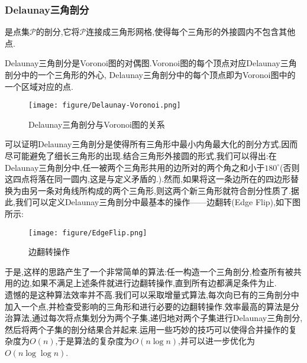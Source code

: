 \documentclass{ctexart}
\begin{document}
\subsubsection{Delaunay三角剖分}
\begin{definition}[Delaunay三角剖分]
    是点集$\mathcal{P}$的剖分,它将$\mathcal{P}$连接成三角形网格,使得每个三角形的外接圆内不包含其他点.
\end{definition}
Delaunay三角剖分是Voronoi图的对偶图.Voronoi图的每个顶点对应Delaunay三角剖分中的一个三角形的外心, Delaunay三角剖分中的每个顶点即为Voronoi图中的一个区域对应的点.
\begin{figure}[H]\centering
    \texttt{[image: figure/Delaunay-Voronoi.png]}
    \caption{Delaunay三角剖分与Voronoi图的关系}
\end{figure}
可以证明Delaunay三角剖分是使得所有三角形中最小内角最大化的剖分方式,因而尽可能避免了细长三角形的出现.结合三角形外接圆的形式,我们可以得出:在Delaunay三角剖分中,任一被两个三角形共用的边所对的两个角之和小于$180^\circ$(否则这四点将落在同一圆内,这是与定义矛盾的.).然而,如果将这一条边所在的四边形替换为由另一条对角线所构成的两个三角形,则这两个新三角形就符合剖分性质了.据此,我们可以定义Delaunay三角剖分中最基本的操作——边翻转(Edge Flip),如下图所示:
\begin{figure}[H]\centering
    \texttt{[image: figure/EdgeFlip.png]}
    \caption{边翻转操作}
\end{figure}
于是,这样的思路产生了一个非常简单的算法:任一构造一个三角剖分,检查所有被共用的边,如果不满足上述条件就进行边翻转操作,直到所有边都满足条件为止.\\
\indent 遗憾的是这种算法效率并不高.我们可以采取增量式算法,每次向已有的三角剖分中加入一个点,并检查受影响的三角形和进行必要的边翻转操作.效率最高的算法是分治算法,通过每次将点集划分为两个子集,递归地对两个子集进行Delaunay三角剖分,然后将两个子集的剖分结果合并起来.运用一些巧妙的技巧可以使得合并操作的复杂度为$O(n)$,于是算法的复杂度为$O(n\log n)$,并可以进一步优化为$O(n\log\log n)$.
\end{document}
